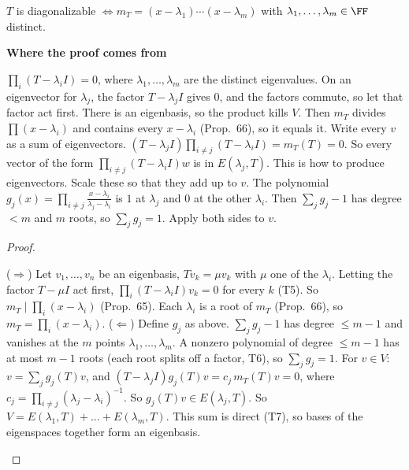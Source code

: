 \documentclass[10pt]{scrartcl}
\newenvironment{motive}{\begin{mdframed}[style=thinkbox]\textbf{\color{OliveGreen!75!black}Where the proof comes from}\begin{description}[leftmargin=0.9em,labelindent=0pt,itemsep=2pt,topsep=2pt,font=\normalfont\bfseries\color{OliveGreen!70!black}]}{\end{description}\end{mdframed}}
\newenvironment{steps}{\begin{enumerate}[label=\arabic*.,leftmargin=1.5em,itemsep=2pt,topsep=2pt]}{\end{enumerate}}
\begin{document}
\begin{proposition*}
  $T$ is diagonalizable $\iff m_T=(x-\lambda_1)\cdots(x-\lambda_m)$ with $\lambda_1,\dots,\lambda_m\in\FF$ distinct.
\end{proposition*}
\begin{motive}
   $\prod_i(T-\lambda_iI)=0$, where $\lambda_1,\dots,\lambda_m$ are the distinct eigenvalues.
   On an eigenvector for $\lambda_j$, the factor $T-\lambda_jI$ gives $0$, and the factors commute, so let that factor act first. There is an eigenbasis, so the product kills $V$. Then $m_T$ divides $\prod(x-\lambda_i)$ and contains every $x-\lambda_i$ (Prop.~66), so it equals it.
   Write every $v$ as a sum of eigenvectors.
  \ii[Know.] $(T-\lambda_jI)\prod_{i\ne j}(T-\lambda_iI)=m_T(T)=0$. So every vector of the form $\prod_{i\ne j}(T-\lambda_iI)w$ is in $E(\lambda_j,T)$. This is how to produce eigenvectors.
   Scale these so that they add up to $v$. The polynomial $g_j(x)=\prod_{i\ne j}\frac{x-\lambda_i}{\lambda_j-\lambda_i}$ is $1$ at $\lambda_j$ and $0$ at the other $\lambda_i$. Then $\sum_jg_j-1$ has degree $<m$ and $m$ roots, so $\sum_jg_j=1$. Apply both sides to $v$.
\end{motive}
\begin{proof}
  \begin{steps}
    \ii ($\Rightarrow$) Let $v_1,\dots,v_n$ be an eigenbasis, $Tv_k=\mu v_k$ with $\mu$ one of the $\lambda_i$. Letting the factor $T-\mu I$ act first, $\prod_i(T-\lambda_iI)v_k=0$ for every $k$ (T5). So $m_T\mid\prod_i(x-\lambda_i)$ (Prop.~65). Each $\lambda_i$ is a root of $m_T$ (Prop.~66), so $m_T=\prod_i(x-\lambda_i)$.
    \ii ($\Leftarrow$) Define $g_j$ as above. $\sum_jg_j-1$ has degree $\le m-1$ and vanishes at the $m$ points $\lambda_1,\dots,\lambda_m$. A nonzero polynomial of degree $\le m-1$ has at most $m-1$ roots (each root splits off a factor, T6), so $\sum_jg_j=1$.
    \ii For $v\in V$: $v=\sum_jg_j(T)v$, and $(T-\lambda_jI)g_j(T)v=c_j\,m_T(T)v=0$, where $c_j=\prod_{i\ne j}(\lambda_j-\lambda_i)^{-1}$. So $g_j(T)v\in E(\lambda_j,T)$.
    \ii So $V=E(\lambda_1,T)+\dots+E(\lambda_m,T)$. This sum is direct (T7), so bases of the eigenspaces together form an eigenbasis.
  \end{steps}
\end{proof}
\end{document}
